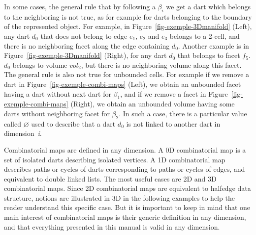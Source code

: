 In some cases, the general rule that by following a $\beta_i$ we get a
dart which belongs to the neighboring  is not true, as for example
for darts belonging to the boundary of the represented
object. For example, in Figure~\ref{fig-exemple-3Dmanifold} (Left), any dart
$d_0$ that does not belong to edge $e_1$, $e_2$ and $e_3$
belongs to a 2-cell, and there is no neighboring facet along the edge containing $d_0$.
Another example is in Figure~\ref{fig-exemple-3Dmanifold} (Right), for
any dart $d_0$ that belongs to facet $f_5$.
$d_0$ belongs to volume $vol_2$, but there is no neighboring volume
along this facet.  The general rule is also not true for unbounded
cells. For example if we remove a dart in
Figure~\ref{fig-exemple-combi-maps} (Left), we obtain an unbounded
facet having a dart without next dart for $\beta_1$, and if we remove
a facet in Figure~\ref{fig-exemple-combi-maps} (Right), we obtain an
unbounded volume having some darts without neighboring facet for
$\beta_2$.  In such a case, there is a particular value called
$\varnothing$ used to describe that a dart $d_0$ is not linked to
another dart in dimension~\emph{i}.


Combinatorial maps are defined in any dimension. A 0D combinatorial
map is a set of isolated darts describing isolated vertices. A 1D
combinatorial map describes paths or cycles of darts corresponding to
paths or cycles of edges, and equivalent to double linked lists.  The
most useful cases are 2D and 3D combinatorial maps. Since 2D
combinatorial maps are equivalent to halfedge data structure, notions
are illustrated in 3D in the following examples to help the reader 
understand this specific case. But it is important to keep in mind
that one main interest of combinatorial maps is their generic
definition in any dimension, and that everything presented in this
manual is valid in any dimension.

